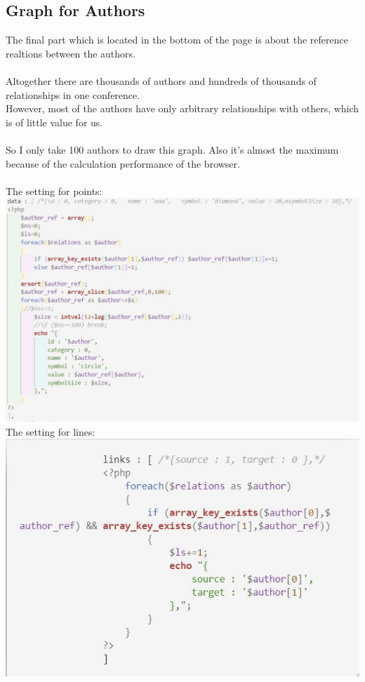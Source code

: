 \documentclass{article}
\begin{document}
	\subsection{Graph for Authors}
	The final part which is located in the bottom of the page is about the reference realtions between the authors.\\\\
	Altogether there are thousands of authors and hundreds of thousands of relationships in one conference.\\
	However, most of the authors have only arbitrary relationships with others, which is of little value for us.\\\\
	So I only take 100 authors to draw this graph. Also it's almost the maximum because of the calculation performance of the browser.\\\\
	\newpage
	The setting for points:\\
	\includegraphics[width=\textwidth]{code3.jpg}\\
	The setting for lines:\\
	\includegraphics[width=\textwidth]{code4.jpg}\\\\
\end{document}
